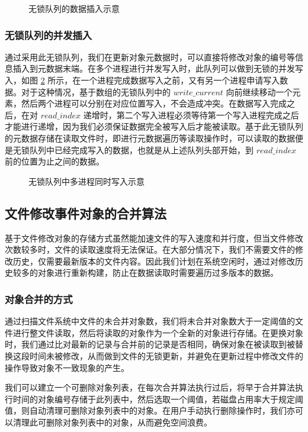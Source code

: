 \begin{figure}[!htb]
\centering
\resizebox{.8\textwidth}{!}{}
\caption{无锁队列的数据插入示意}
\label{p19}
\end{figure}
\subsubsection{无锁队列的并发插入}
通过采用此无锁队列，我们在更新对象元数据时，可以直接将修改对象的编号等信息插入到元数据末端。在多个进程进行并发写入时，此队列可以做到无锁的并发写入，如图 \ref{p20} 所示，在一个进程完成数据写入之前，又有另一个进程申请写入数据。对于这种情况，基于数组的无锁队列中的 $write\_current$ 向前继续移动一个元素，然后两个进程可以分别在对应位置写入，不会造成冲突。在数据写入完成之后，在对 $read\_index$ 递增时，第二个写入进程必须等待第一个写入进程完成之后才能进行递增，因为我们必须保证数据完全被写入后才能被读取。基于此无锁队列的元数据存储在读取文件时，即进行元数据遍历等读取操作时，可以读取的数据便是无锁队列中已经完成写入的数据，也就是从上述队列头部开始，到 $read\_index$ 前的位置为止之间的数据。

\begin{figure}[!htb]
\centering
\resizebox{.8\textwidth}{!}{}
\caption{无锁队列中多进程同时写入示意}
\label{p20}
\end{figure}
\subsection{文件修改事件对象的合并算法}
基于文件修改对象的存储方式虽然能加速文件的写入速度和并行度，但当文件修改次数较多时，文件的读取速度将无法保证。在大部分情况下，我们不需要文件的修改历史，仅需要最新版本的文件内容。因此我们计划在系统空闲时，通过对修改历史较多的对象进行重新构建，防止在数据读取时需要遍历过多版本的数据。
\subsubsection{对象合并的方式}
通过扫描文件系统中文件的未合并对象数，我们将未合并对象数大于一定阈值的文件进行整文件读取，然后将读取的对象作为一个全新的对象进行存储。在更换对象时，我们通过比对最新的记录与合并前的记录是否相同，确保对象在被读取到被替换这段时间未被修改，从而做到文件的无锁更新，并避免在更新过程中修改文件的操作导致对象不一致现象的产生。

我们可以建立一个可删除对象列表，在每次合并算法执行过后，将早于合并算法执行时间的对象编号存储于此列表中，然后选取一个阈值，若磁盘占用率大于规定阈值，则自动清理可删除对象列表中的对象。在用户手动执行删除操作时，我们亦可以清理此可删除对象列表中的对象，从而避免空间浪费。
